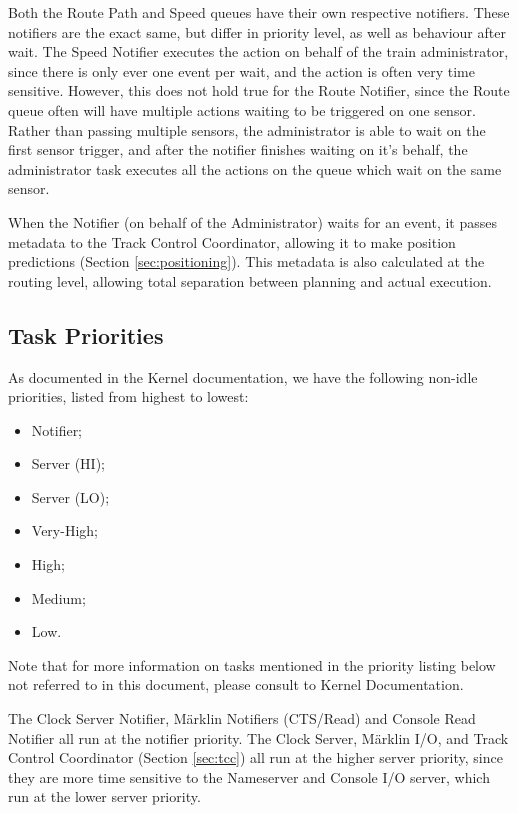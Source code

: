 \documentclass[12pt, titlepage]{article}
\begin{document}
    Both the Route Path and Speed queues have their own respective notifiers. These notifiers are the exact same, but differ in priority level, as well as behaviour after wait. The Speed Notifier executes the action on behalf of the train administrator, since there is only ever one event per wait, and the action is often very time sensitive. However, this does not hold true for the Route Notifier, since the Route queue often will have multiple actions waiting to be triggered on one sensor. Rather than passing multiple sensors, the administrator is able to wait on the first sensor trigger, and after the notifier finishes waiting on it's behalf, the administrator task executes all the actions on the queue which wait on the same sensor.
    
    When the Notifier (on behalf of the Administrator) waits for an event, it passes metadata to the Track Control Coordinator, allowing it to make position predictions (Section \ref{sec:positioning}). This metadata is also calculated at the routing level, allowing total separation between planning and actual execution.
    
    \subsection{Task Priorities}
    
    As documented in the Kernel documentation, we have the following non-idle priorities, listed from highest to lowest:
    \begin{itemize}
        \item Notifier;
        \item Server (HI);
        \item Server (LO);
        \item Very-High;
        \item High;
        \item Medium;
        \item Low.
    \end{itemize}
    Note that for more information on tasks mentioned in the priority listing below not referred to in this document, please consult to Kernel Documentation.
    
    The Clock Server Notifier, Märklin Notifiers (CTS/Read) and Console Read Notifier all run at the notifier priority. The Clock Server, Märklin I/O, and Track Control Coordinator (Section \ref{sec:tcc}) all run at the higher server priority, since they are more time sensitive to the Nameserver and Console I/O server, which run at the lower server priority.
    
\end{document}
